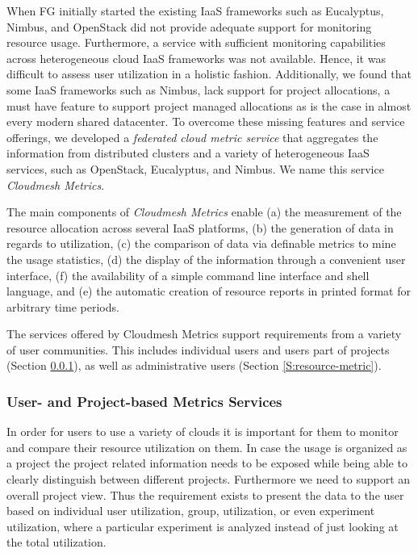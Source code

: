 \documentclass{tex/sig-alternate-2013}
\newcommand{\todo}[1]{{\color{red}{#1}}}
\begin{document}
{When FG initially started the existing IaaS frameworks such as Eucalyptus, Nimbus, and OpenStack did not provide adequate support for monitoring resource usage. Furthermore, a service with sufficient monitoring capabilities across heterogeneous cloud IaaS frameworks was not available. Hence, it was difficult to assess user utilization in a holistic fashion. Additionally, we found that some IaaS frameworks such as Nimbus, lack support for project allocations, a must have feature to support project managed allocations as is the case in almost every modern shared datacenter.  To overcome these missing features and service offerings, we developed a {\em federated cloud metric service} that aggregates the information from distributed clusters and a variety of heterogeneous IaaS services, such as OpenStack, Eucalyptus, and Nimbus. We name this service {\em Cloudmesh Metrics}.

The main components of {\em Cloudmesh Metrics} enable (a) the measurement of the resource allocation across several IaaS platforms, (b) the generation of data in regards to utilization, (c) the comparison of data via definable metrics to mine the usage statistics, (d) the display of the information through a convenient user interface, (f) the availability of a simple command line interface and shell language, and (e) the automatic creation of resource reports in printed format for arbitrary time periods.

The services offered by Cloudmesh Metrics support requirements from a variety of user communities. This includes individual users and users part of projects (Section \ref{S:user-metric}), as well as administrative users (Section \ref{S:resource-metric}).


\subsubsection{User- and Project-based Metrics Services}\label{S:user-metric} 

\todo{READ}

In order for users to use a variety of clouds it is important for them to monitor and compare their resource utilization on them. In case the usage is organized as a project the project related information needs to be exposed while being able to clearly distinguish between different projects. Furthermore we need to support an overall project view.  Thus the requirement exists to present the data to the user based on individual user utilization, group, utilization, or even experiment utilization, where a particular experiment is analyzed instead of just looking at the total utilization.

}
\end{document}

